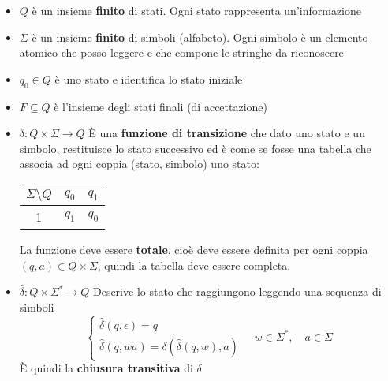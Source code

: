 \documentclass[a4paper]{article}
\begin{document}
\begin{itemize}
  \item \( Q \) è un insieme \textbf{finito} di stati. Ogni stato rappresenta
    un'informazione

  \item \( \Sigma  \) è un insieme \textbf{finito} di simboli (alfabeto).
    Ogni simbolo è un elemento atomico che posso leggere e che compone le
    stringhe da riconoscere
    
  \item \( q_0 \in Q \) è uno stato e identifica lo stato iniziale

  \item \( F \subseteq Q \) è l'insieme degli stati finali (di accettazione)

  \item \( \delta: Q \times \Sigma \to Q \) È una \textbf{funzione di transizione}
    che dato uno stato e un simbolo, restituisce lo stato successivo ed è come se
    fosse una tabella che associa ad ogni coppia (stato, simbolo) uno stato:
    \begin{table}[H]
      \centering
      \begin{tabular}{c|c|c}
        \( \Sigma \setminus Q\) & \( q_0 \) & \( q_1 \)\\
        \hline
        1 & \( q_1 \) & \( q_0 \)\\
      \end{tabular}
    \end{table}
    La funzione deve essere \textbf{totale}, cioè deve essere definita per ogni
    coppia \( (q,a) \in Q \times \Sigma  \), quindi la tabella deve essere completa.

  \item \( \hat{\delta}: Q \times \Sigma^* \to Q \) Descrive lo stato che raggiungono
    leggendo una sequenza di simboli
    \[
      \begin{cases}
        \hat{\delta}(q, \epsilon) = q\\
        \hat{\delta}(q, wa) = \delta(\hat{\delta}(q,w), a)
      \end{cases}
      \quad
      w \in \Sigma^*, \quad a \in \Sigma 
    \] 
    È quindi la \textbf{chiusura transitiva} di \( \delta \)
\end{itemize}
\end{document}
